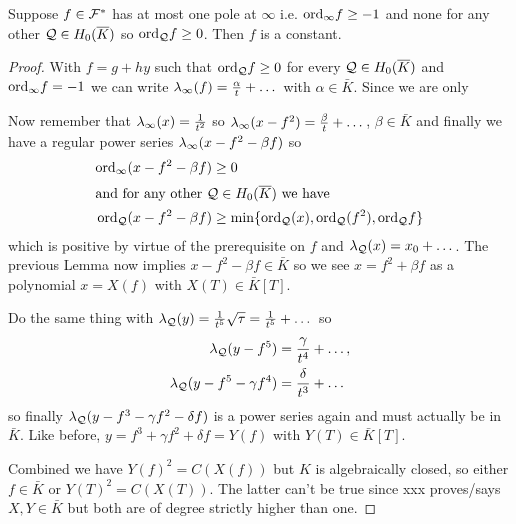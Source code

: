 \documentclass[english,11pt,a4paper]{article}
\begin{document}
\begin{lemma}
	Suppose $f \in \mathcal{F}^*$ has at most one pole at $\infty$ i.e. $\text{ord}_{\infty} f \geq -1$ and none for any other $\mathcal{Q} \in H_0(\overline K)$ so $\text{ord}_{\mathcal{Q}} f \geq 0$. Then $f$ is a constant.

	\begin{proof}
		With $f = g+hy$ such that $\text{ord}_{\mathcal{Q}} f \geq 0$ for every $\mathcal{Q} \in H_0(\overline K)$ and $\text{ord}_{\infty} f = -1$ we can write $\lambda_{\infty} (f) = \frac \alpha t + \dots$ with $\alpha \in \bar K$. Since we are only 

		Now remember that $\lambda_{\infty} (x) = \frac{1}{t^2}$ so $\lambda_{\infty} (x - f^2) = \frac \beta t + \dots$, $\beta \in \bar K$ and finally we have a regular power series $\lambda_{\infty} (x - f^2 - \beta f)$ so
		\begin{align*}
		  \text{ord}_{\infty} (x - f^2 - \beta f) &\geq 0\\
		\intertext{and for any other $\mathcal{Q} \in H_0(\overline K)$ we have}
		  \text{ord}_{\mathcal{Q}} (x - f^2 - \beta f) &\geq \min \{ \text{ord}_{\mathcal{Q}} (x) , \text{ord}_{\mathcal{Q}} (f^2) , \text{ord}_{\mathcal{Q}} f \}
		\end{align*}
		which is positive by virtue of the prerequisite on $f$ and $\lambda_{\mathcal{Q}}(x) = x_0 + \dots$. The previous Lemma now implies $x - f^2 - \beta f \in \bar K$ so we see $x = f^2 + \beta f$ as a polynomial $x = X(f)$ with $X(T) \in \bar K[T]$.

		Do the same thing with $\lambda_{\mathcal{Q}}(y) = \frac{1}{t^5}\sqrt \tau = \frac{1}{t^5} + \dots$ so
		\begin{align*}
		  \lambda_{\mathcal{Q}} (y - f^5) &= \frac{\gamma}{t^4} + \dots,\\
		  \lambda_{\mathcal{Q}} (y - f^5 - \gamma f^4) &= \frac{\delta}{t^3} + \dots
		\end{align*}
		so finally $\lambda_{\mathcal{Q}} (y - f^3 - \gamma f^2 - \delta f)$ is a power series again and must actually be in $\bar K$. Like before, $y = f^3 + \gamma f^2 + \delta f = Y(f)$ with $Y(T)\in \bar K[T]$.

		Combined we have $Y(f)^2 = C(X(f))$ but $K$ is algebraically closed, so either $f \in \bar K$ or $Y(T)^2 = C(X(T))$. The latter can't be true since xxx proves/says $X, Y \in \bar K$ but both are of degree strictly higher than one. %
	\end{proof}
\end{lemma}
\end{document}
